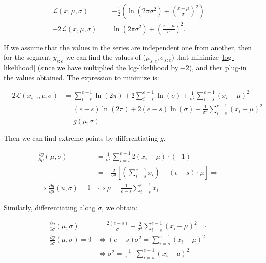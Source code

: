\documentclass[pdflatex,sn-mathphys]{sn-jnl}%
\theoremstyle{thmstyleone}%
\theoremstyle{thmstyletwo}%
\theoremstyle{thmstylethree}%
\begin{document}
\begin{align}
    \mathcal{L}(x, \mu, \sigma) & =  -\frac{1}{2} \left ( \ln(2 \pi \sigma^2) + \left ( \frac{x-\mu}{\sigma} \right )^2 \right ) \nonumber \\
    -2\mathcal{L}(x, \mu, \sigma) & = \ln(2 \pi \sigma^2) + \left ( \frac{x-\mu}{\sigma} \right )^2.
    \label{log-likelihood}
\end{align}

If we assume that the values in the series are independent one from another, then for the segment $y_{s:e}$ we can find the values of ($\mu_{s:e}, \sigma_{s:e}$) that minimize \ref{log-likelihood} (since we have multiplied the log-likelihood by $-2$), and then plug-in the values obtained. The expression to minimize is:

\begin{align}
    -2 \mathcal{L}(x_{s:e}, \mu, \sigma) & = \sum\limits_{i = s}^{e-1} \ln(2\pi) + 2 \sum\limits_{i = s}^{e-1} \ln(\sigma) + \frac{1}{\sigma^2} \sum\limits_{i = s}^{e-1}(x_i - \mu)^2 \nonumber \\
     & =(e-s)\ln(2\pi) + 2(e-s)\ln(\sigma) + \frac{1}{\sigma^2} \sum\limits_{i = s}^{e-1}(x_i - \mu)^2 \nonumber \\
     & = g(\mu, \sigma) \nonumber
\end{align}

Then we can find extreme points by differentiating $g$. 

\begin{align}
    \frac{\partial g}{\partial \mu}(\mu, \sigma) & = \frac{1}{\sigma^2}\sum\limits_{i = s}^{e-1}2(x_i-\mu)\cdot (-1) \nonumber \\ & = -\frac{2}{\sigma^2} \left [ \left ( \sum\limits_{i=s}^{e-1} x_i \right ) - (e-s) \cdot \mu  \right ] \Rightarrow \nonumber \\
    \Rightarrow \frac{\partial g}{\partial \mu}(u,\sigma) = 0 & \iff \mu = \frac{1}{e-s} \sum\limits_{i=s}^{e-1} x_i
    \label{mu_found}
\end{align}

Similarly, differentiating along $\sigma$, we obtain:

\begin{align}
    \frac{\partial g}{\partial \sigma}(\mu, \sigma) & = \frac{2(e-s)}{\sigma} - \frac{2}{\sigma^3} \sum\limits_{i=s}^{e-1}(x_i - \mu)^2 \Rightarrow \nonumber \\
    \frac{\partial g}{\partial \sigma} (\mu, \sigma) = 0 & \iff (e-s)\sigma^2 = \sum\limits_{i=s}^{e-1}(x_i - \mu)^2 \nonumber \\ & \iff \sigma^2 = \frac{1}{e-s}\sum\limits_{i=s}^{e-1}(x_i - \mu)^2
    \label{sigma_found}
\end{align}
\end{document}
